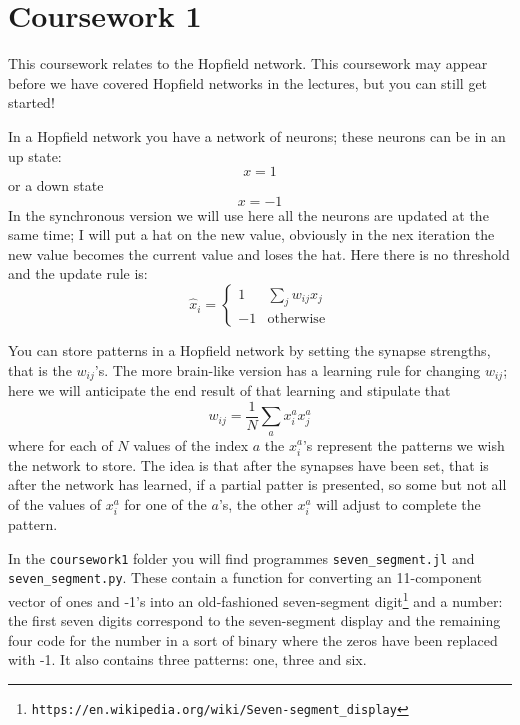 \documentclass[12pt]{article}
\begin{document}
\section*{Coursework 1}

This coursework relates to the Hopfield network. This coursework may
appear before we have covered Hopfield networks in the lectures, but
you can still get started!

In a Hopfield network you have a network of
neurons; these neurons can be in an up state:
\begin{equation}
  x=1
\end{equation}
or a down state
\begin{equation}
  x=-1
\end{equation}
In the synchronous version we will use here all the neurons are
updated at the same time; I will put a hat on the new value, obviously
in the nex iteration the new value becomes the current value and loses
the hat. Here there is no threshold and the update rule is:
\begin{equation}
  \hat{x}_i=\left\{\begin{array}{ll}1&\sum_j w_{ij}x_j\\-1&\text{otherwise}\end{array}\right.
\end{equation}

You can store patterns in a Hopfield network by setting the synapse
strengths, that is the $w_{ij}$'s. The more brain-like version has a
learning rule for changing $w_{ij}$; here we will anticipate the end
result of that learning and stipulate that
\begin{equation}
w_{ij}=\frac{1}{N}\sum_a x_i^a x_j^a
\end{equation}
where for each of $N$ values of the index $a$ the $x_i^a$'s represent
the patterns we wish the network to store. The idea is that after the
synapses have been set, that is after the network has learned, if a
partial patter is presented, so some but not all of the values of
$x_i^a$ for one of the $a$'s, the other $x_i^a$ will adjust to
complete the pattern.



In the \texttt{coursework1} folder you will find programmes
\texttt{seven\_segment.jl} and \texttt{seven\_segment.py}. These
contain a function for converting an 11-component vector of ones and
-1's into an old-fashioned seven-segment
digit\footnote{\texttt{https://en.wikipedia.org/wiki/Seven-segment\_display}}
and a number: the first seven digits correspond to the seven-segment
display and the remaining four code for the number in a sort of binary
where the zeros have been replaced with -1. It also contains three
patterns: one, three and six.
\end{document}
